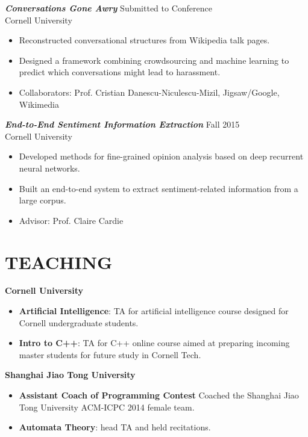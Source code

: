 \documentclass[margin, 10pt]{res} %
\begin{document}
\begin{resume}
{\sl \textbf{Conversations Gone Awry}} \hfill Submitted to Conference\\
Cornell University
\begin{itemize}
\item Reconstructed conversational structures from Wikipedia talk pages.
\item Designed a framework combining crowdsourcing and machine learning to predict which conversations might lead to harassment. 
\item Collaborators: Prof. Cristian Danescu-Niculescu-Mizil, Jigsaw/Google, Wikimedia
\end{itemize}

{\sl \textbf{End-to-End Sentiment Information Extraction}} \hfill Fall 2015\\
Cornell University
\begin{itemize}
\item Developed methods for fine-grained opinion analysis based on deep recurrent
  neural networks.
\item Built an end-to-end system to extract sentiment-related information
  from a large corpus.
\item Advisor: Prof. Claire Cardie
\end{itemize}

\section{TEACHING}
\textbf{Cornell University}
\begin{itemize}
\item \textbf{Artificial Intelligence}: TA for artificial intelligence course designed for Cornell undergraduate students.
\item \textbf{Intro to C++}: TA for C++ online course aimed at preparing incoming master students for future study in Cornell Tech. 
\end{itemize} 

\textbf{Shanghai Jiao Tong University}
\begin{itemize}
\item \textbf{Assistant Coach of Programming Contest} Coached the Shanghai Jiao Tong University ACM-ICPC 2014 female team.
\item \textbf{Automata Theory}: head TA and held recitations. 
\end{itemize}



 

\end{resume}
\end{document}
